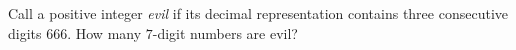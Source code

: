 Call a positive integer \emph{evil} if its decimal representation contains three consecutive digits $666$. How many $7$-digit numbers are evil?
